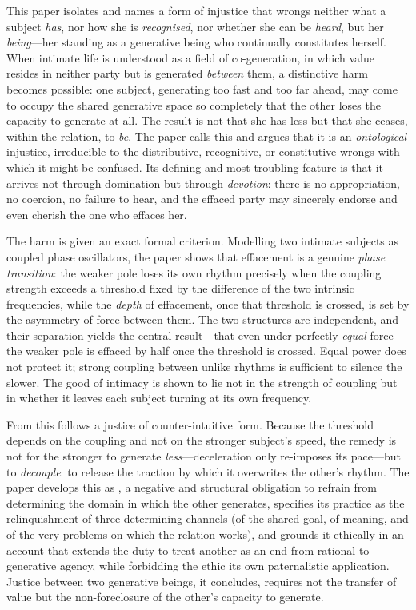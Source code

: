 This paper isolates and names a form of injustice that wrongs neither what a subject \emph{has}, nor how she is \emph{recognised}, nor whether she can be \emph{heard}, but her \emph{being}---her standing as a generative being who continually constitutes herself. When intimate life is understood as a field of co-generation, in which value resides in neither party but is generated \emph{between} them, a distinctive harm becomes possible: one subject, generating too fast and too far ahead, may come to occupy the shared generative space so completely that the other loses the capacity to generate at all. The result is not that she has less but that she ceases, within the relation, to \emph{be}. The paper calls this  and argues that it is an \emph{ontological} injustice, irreducible to the distributive, recognitive, or constitutive wrongs with which it might be confused. Its defining and most troubling feature is that it arrives not through domination but through \emph{devotion}: there is no appropriation, no coercion, no failure to hear, and the effaced party may sincerely endorse and even cherish the one who effaces her.

The harm is given an exact formal criterion. Modelling two intimate subjects as coupled phase oscillators, the paper shows that effacement is a genuine \emph{phase transition}: the weaker pole loses its own rhythm precisely when the coupling strength exceeds a threshold fixed by the difference of the two intrinsic frequencies, while the \emph{depth} of effacement, once that threshold is crossed, is set by the asymmetry of force between them. The two structures are independent, and their separation yields the central result---that even under perfectly \emph{equal} force the weaker pole is effaced by half once the threshold is crossed. Equal power does not protect it; strong coupling between unlike rhythms is sufficient to silence the slower. The good of intimacy is shown to lie not in the strength of coupling but in whether it leaves each subject turning at its own frequency.

From this follows a justice of counter-intuitive form. Because the threshold depends on the coupling and not on the stronger subject's speed, the remedy is not for the stronger to generate \emph{less}---deceleration only re-imposes its pace---but to \emph{decouple}: to release the traction by which it overwrites the other's rhythm. The paper develops this as , a negative and structural obligation to refrain from determining the domain in which the other generates, specifies its practice as the relinquishment of three determining channels (of the shared goal, of meaning, and of the very problems on which the relation works), and grounds it ethically in an account that extends the duty to treat another as an end from rational to generative agency, while forbidding the ethic its own paternalistic application. Justice between two generative beings, it concludes, requires not the transfer of value but the non-foreclosure of the other's capacity to generate.
